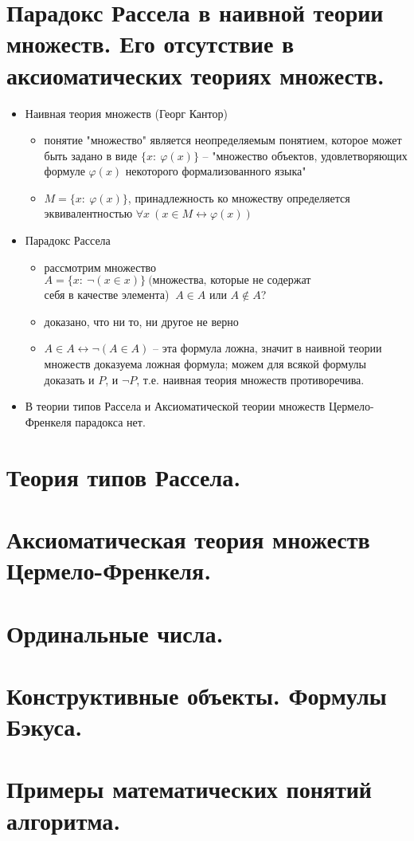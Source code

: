 \documentclass[a4paper,12pt]{article}
\theoremstyle{definition} %
\theoremstyle{definition} %
\theoremstyle{remark} %
\begin{document}
\section{Парадокс Рассела в наивной теории множеств. Его отсутствие в аксиоматических теориях	множеств.}
	\begin{itemize}
		\item Наивная теория множеств (Георг Кантор)
			\begin{itemize}
				\item понятие "множество" является неопределяемым понятием, которое может быть задано в виде $\{x: \ \varphi (x)\}$ -- "множество объектов, удовлетворяющих формуле $\varphi (x)$ некоторого формализованного языка"
				\item $M = \{x: \ \varphi (x) \}$, принадлежность ко множеству определяется эквивалентностью $\forall x \ (x \in M \leftrightarrow \varphi (x))$
			\end{itemize}
		\item Парадокс Рассела
			\begin{itemize}
				\item рассмотрим множество $A = \{x: \ \neg (x \in x) \} \ \text{(множества, которые не содержат}$ \\[1ex] 
				себя в качестве элемента) $\ A \in A$ или $A \notin A$?
				\item доказано, что ни то, ни другое не верно
				\item $A \in A \leftrightarrow \neg (A \in A)$ -- эта формула ложна, значит в наивной теории множеств доказуема ложная формула; можем для всякой формулы доказать и $P$, и $\neg P$, т.е. наивная теория множеств противоречива.
			\end{itemize}
		\item В теории типов Рассела и Аксиоматической теории множеств Цермело-Френкеля парадокса нет.
	\end{itemize}

\section{Теория типов Рассела.}

\section{Аксиоматическая теория множеств Цермело-Френкеля.}

\section{Ординальные числа.}

\section{Конструктивные объекты. Формулы Бэкуса.}

\section{Примеры математических понятий алгоритма.}
\end{document}
